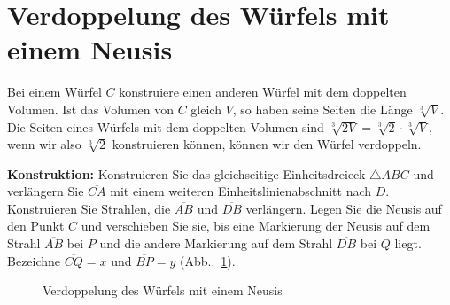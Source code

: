 \section{Verdoppelung des Würfels mit einem Neusis}\label{s.neusis-doubling}

Bei einem Würfel $C$ konstruiere einen anderen Würfel mit dem doppelten Volumen. Ist das Volumen von $C$ gleich $V$, so haben seine Seiten die Länge $\sqrt[3]{V}$. Die Seiten eines Würfels mit dem doppelten Volumen sind $\sqrt[3]{2 V}=\sqrt[3]{2}\cdot\sqrt[3]{V}$, wenn wir also $\sqrt[3]{2}$ konstruieren können, können wir den Würfel verdoppeln.

\smallskip

\noindent\textbf{Konstruktion:}
Konstruieren Sie das gleichseitige Einheitsdreieck $\triangle ABC$ und verlängern Sie $\overline{CA}$ mit einem weiteren Einheitslinienabschnitt nach $D$. Konstruieren Sie Strahlen, die $\overline{AB}$ und $\overline{DB}$ verlängern. Legen Sie die Neusis auf den Punkt $C$ und verschieben Sie sie, bis eine Markierung der Neusis auf dem Strahl $\overline{AB}$ bei $P$ und die andere Markierung auf dem Strahl $\overline{DB}$ bei $Q$ liegt. Bezeichne $\overline{CQ}=x$ und $\overline{BP}=y$ (Abb..~\ref{f.double-neusis}).

\begin{figure}[b]
\begin{center}
\end{center}
\caption{Verdoppelung des Würfels mit einem Neusis}\label{f.double-neusis}
\end{figure}

